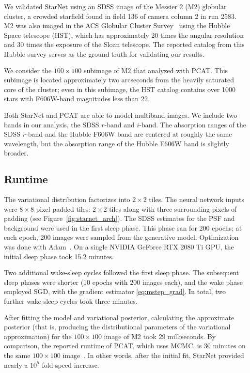 \label{sec:results_on_m2}
We validated StarNet using an SDSS image of the Messier 2 (M2) globular cluster, a crowded starfield found in field 136 of camera column 2 in run 2583.
M2 was also imaged in the ACS Globular Cluster Survey~\cite{Sarajedini_2007}
using the Hubble Space telescope (HST),
which has approximately 20 times the angular resolution and 30 times the exposure of the Sloan telescope. The reported catalog from this Hubble survey serves as the ground truth for validating our results.

We consider the $100 \times 100$ subimage of M2 that \cite{Portillo_2017, Feder_2019} analyzed with PCAT.
This subimage is located approximately two arcseconds from the heavily saturated core of the cluster;
even in this subimage, the HST catalog contains over 1000 stars with F606W-band magnitudes less than 22.

Both StarNet and PCAT are able to model multiband images. We include two bands in our analysis, the SDSS $r$-band and $i$-band. 
The absorption ranges of the SDSS $r$-band and the Hubble F606W band are centered at roughly the same wavelength, but the absorption range of the Hubble F606W band is slightly broader. 

\subsection{Runtime} 
\label{sec:runtime}
The variational distribution factorizes into $2\times2$ tiles. 
The neural network inputs were $8\times8$ pixel padded tiles: 
$2\times 2$ tiles along with three surrounding pixels of padding (see Figure~\ref{fig:starnet_arch}). 
The SDSS estimates for the PSF and background were used in the first sleep phase. 
This phase ran for 200 epochs; at each epoch, 200 images were sampled from the generative model. 
Optimization was done with Adam~\cite{kingma2014adam}. 
On a single NVIDIA GeForce RTX 2080 Ti GPU, 
the initial sleep phase took 15.2 minutes.

Two additional wake-sleep cycles followed the first sleep phase. 
The subsequent sleep phases were shorter (10 epochs with 200 images each), and the wake phase employed SGD, with the gradient estimator \eqref{eq:mstep_grad}. In total, two further wake-sleep cycles took three minutes. 

After fitting the model and variational posterior, calculating the approximate posterior (that is, producing the distributional parameters of the variational approximation) for the $100 \times 100$ image of M2 took $29$ milliseconds. 
By comparison, the reported runtime of PCAT, which uses MCMC, is 30 minutes on the same $100 \times 100$ image~\cite{Feder_2019}.
In other words, after the initial fit, StarNet provided nearly a $10^5$-fold speed increase. 


